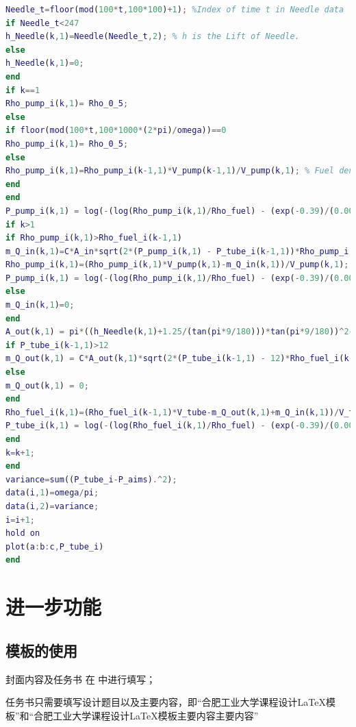\begin{lstlisting}[language=matlab]
Needle_t=floor(mod(100*t,100*100)+1); %Index of time t in Needle data
if Needle_t<247
h_Needle(k,1)=Needle(Needle_t,2); % h is the Lift of Needle.
else
h_Needle(k,1)=0;
end
if k==1
Rho_pump_i(k,1)= Rho_0_5; 
else
if floor(mod(100*t,100*1000*(2*pi)/omega))==0
Rho_pump_i(k,1)= Rho_0_5;
else
Rho_pump_i(k,1)=Rho_pump_i(k-1,1)*V_pump(k-1,1)/V_pump(k,1); % Fuel density in the oil pump at the current time.
end
end
P_pump_i(k,1) = log(-(log(Rho_pump_i(k,1)/Rho_fuel) - (exp(-0.39)/(0.0039*exp(7.31))))*0.0039*exp(7.31))*(-1/0.0039);
if k>1 
if Rho_pump_i(k,1)>Rho_fuel_i(k-1,1) 
m_Q_in(k,1)=C*A_in*sqrt(2*(P_pump_i(k,1) - P_tube_i(k-1,1))*Rho_pump_i(k,1))*b;
Rho_pump_i(k,1)=(Rho_pump_i(k,1)*V_pump(k,1)-m_Q_in(k,1))/V_pump(k,1);
P_pump_i(k,1) = log(-(log(Rho_pump_i(k,1)/Rho_fuel) - (exp(-0.39)/(0.0039*exp(7.31))))*0.0039*exp(7.31))*(-1/0.0039);
else
m_Q_in(k,1)=0;
end
A_out(k,1) = pi*((h_Needle(k,1)+1.25/(tan(pi*9/180)))*tan(pi*9/180))^2-pi*1.25^2;
if P_tube_i(k-1,1)>12 
m_Q_out(k,1) = C*A_out(k,1)*sqrt(2*(P_tube_i(k-1,1) - 12)*Rho_fuel_i(k-1,1))*b;
else
m_Q_out(k,1) = 0;
end
Rho_fuel_i(k,1)=(Rho_fuel_i(k-1,1)*V_tube-m_Q_out(k,1)+m_Q_in(k,1))/V_tube;
P_tube_i(k,1) = log(-(log(Rho_fuel_i(k,1)/Rho_fuel) - (exp(-0.39)/(0.0039*exp(7.31))))*0.0039*exp(7.31))*(-1/0.0039);
end
k=k+1;
end
variance=sum((P_tube_i-P_aims).^2);
data(i,1)=omega/pi;
data(i,2)=variance;
i=i+1;
hold on
plot(a:b:c,P_tube_i)
end

\end{lstlisting}



\section{进一步功能}

\subsection{模板的使用}

封面内容及任务书 在 中进行填写；

任务书只需要填写设计题目以及主要内容，即“合肥工业大学课程设计\LaTeX 模板”和“合肥工业大学课程设计\LaTeX 模板主要内容主要内容”

